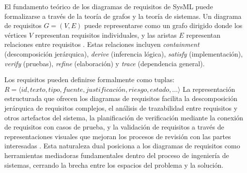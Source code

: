 El fundamento teórico de los diagramas de requisitos de SysML puede formalizarse a través de la teoría de grafos y la teoría de sistemas.
Un diagrama de requisitos $G = (V, E)$ puede representarse como un grafo dirigido donde los vértices $V$ representan requisitos individuales, y las aristas $E$ representan relaciones entre requisitos \parencite{Weilkiens2011}.
Estas relaciones incluyen \textit{containment} (descomposición jerárquica), \textit{derive} (inferencia lógica), \textit{satisfy} (implementación), \textit{verify} (pruebas), \textit{refine} (elaboración) y \textit{trace} (dependencia general).

Los requisitos pueden definirse formalmente como tuplas:
$R = \langle id, texto, tipo, fuente, justificación, riesgo, estado, ...\rangle$
La representación estructurada que ofrecen los diagramas de requisitos facilita la descomposición jerárquica de requisitos complejos, el análisis de trazabilidad entre requisitos y otros artefactos del sistema, la planificación de verificación mediante la conexión de requisitos con casos de prueba, y la validación de requisitos a través de representaciones visuales que mejoran los procesos de revisión con las partes interesadas \parencite{INCOSE2015}.
Esta naturaleza dual posiciona a los diagramas de requisitos como herramientas mediadoras fundamentales dentro del proceso de ingeniería de sistemas, cerrando la brecha entre los espacios del problema y la solución.

